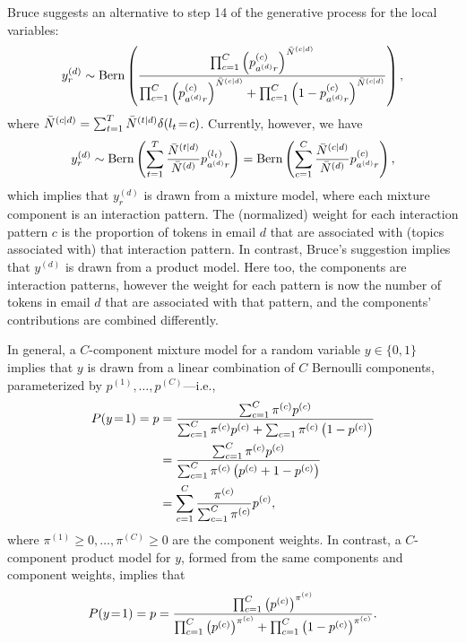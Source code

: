 \documentclass[10pt,english,oneside]{article}
\begin{document}
Bruce suggests an alternative to step 14 of the generative process for
the local variables:
\begin{equation}
  y^{(d)}_r \sim \text{Bern} \left(
  \frac{
    \prod_{c=1}^C
  \left(p^{(c)}_{a^{(d)}r}\right)^{\bar{N}^{(c|d)}}}{
    \prod_{c=1}^C
  \left(p^{(c)}_{a^{(d)}r}\right)^{\bar{N}^{(c|d)}} + \prod_{c=1}^C
  \left(1 - p^{(c)}_{a^{(d)}r}\right)^{\bar{N}^{(c|d)}}}  
  \right),
  \end{equation}
where $\bar{N}^{(c|d)} = \sum_{t=1}^T \bar{N}^{(t|d)} \delta(l_t \!=\!
c)$. Currently, however, we have 
\begin{align}
y_r^{(d)} \sim \text{Bern} \left(
\sum_{t=1}^T \frac{\bar{N}^{(t|d)}}{\bar{N}^{(d)}}
    p^{(l_t)}_{a^{(d)}r}
    \right) = \text{Bern} \left(
\sum_{c=1}^C \frac{\bar{N}^{(c|d)}}{\bar{N}^{(d)}}
    p^{(c)}_{a^{(d)}r}    
    \right),
\end{align}
which implies that $y^{(d)}_r$ is drawn from a mixture model, where
each mixture component is an interaction pattern. The (normalized)
weight for each interaction pattern $c$ is the proportion of tokens in
email $d$ that are associated with (topics associated with) that
interaction pattern. In contrast, Bruce's suggestion implies that
$y^{(d)}$ is drawn from a product model. Here too, the components are
interaction patterns, however the weight for each pattern is now the
number of tokens in email $d$ that are associated with that pattern,
and the components' contributions are combined differently.

In general, a $C$-component mixture model for a random variable $y \in
\{0, 1\}$ implies that $y$ is drawn from a linear combination of $C$
Bernoulli components, parameterized by $p^{(1)}, \ldots,
p^{(C)}$---i.e., 
\begin{align}
  P(y \!=\! 1) = p
  &= \frac{\sum_{c=1}^C \pi^{(c)}
    p^{(c)}}{\sum_{c=1}^C \pi^{(c)} p^{(c)} + \sum_{c=1} \pi^{(c)}
    \left( 1 - p^{(c)}\right)}\\
  &= \frac{\sum_{c=1}^C \pi^{(c)}
    p^{(c)}}{\sum_{c=1}^C \pi^{(c)} \left( p^{(c)} + 1 -
    p^{(c)}\right)}\\
  \label{eqn:mixture}
  &= \sum_{c=1}^C \frac{\pi^{(c)}}{\sum_{c=1}^C \pi^{(c)}} p^{(c)},
\end{align}
where $\pi^{(1)} \geq 0, \ldots, \pi^{(C)} \geq 0$ are the component
weights. In contrast, a $C$-component product model for $y$, formed
from the same components and component weights, implies that
\begin{equation}
  P(y \!=\! 1) = p = \frac{\prod_{c=1}^C \left( p^{(c)}
    \right)^{\pi^{(c)}}}{\prod_{c=1}^C \left(
    p^{(c)}\right)^{\pi^{(c)}}+ \prod_{c=1}^C \left( 1 -
    p^{(c)}\right)^{\pi^{(c)}}}.
\end{equation}
  
\end{document}
